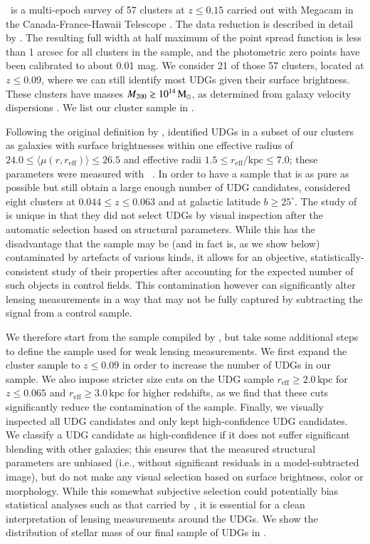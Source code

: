 \documentclass[usenatbib,fleqn]{mnras}
\def\reff{r_\mathrm{eff}}
\begin{document}
\meneacs\ is a multi-epoch survey of 57 clusters at $z\leq0.15$ carried out with Megacam in the Canada-France-Hawaii Telescope \citep{sand12}. The data reduction is described in detail by \cite{vdburg13,vdburg16}. The resulting full width at half maximum of the point spread function is less than 1 arcsec for all clusters in the sample, and the photometric zero points have been calibrated to about 0.01 mag.
%
We consider 21 of those 57 clusters, located at $z\leq0.09$, where we can still identify most UDGs given their surface brightness. These clusters have masses $M_{200}\gtrsim10^{14}\,\mathrm{M}_\odot$, as determined from galaxy velocity dispersions \citep{sifon15_cccp}. We list our cluster sample in .

Following the original definition by \cite{vandokkum15_coma}, \cite{vdburg16} identified UDGs in a subset of our clusters as galaxies with surface brightnesses within one effective radius of $24.0\leq \langle\mu(r,\reff)\rangle\leq26.5$ and effective radii $1.5\leq\reff/\mathrm{kpc}\leq7.0$; these parameters were measured with \galfit\ \citep{peng02,peng10}. In order to have a sample that is as pure as possible but still obtain a large enough number of UDG candidates, \cite{vdburg16} considered eight clusters at $0.044\leq z \leq0.063$ and at galactic latitude $b\geq25^\circ$. The study of \cite{vdburg16} is unique in that they did not select UDGs by visual inspection after the automatic selection based on structural parameters. While this has the disadvantage that the sample may be (and in fact is, as we show below) contaminated by artefacts of various kinds, it allows for an objective, statistically-consistent study of their properties after accounting for the expected number of such objects in control fields. This contamination however can significantly alter lensing measurements in a way that may not be fully captured by subtracting the signal from a control sample.

We therefore start from the sample compiled by \cite{vdburg16}, but take some additional steps to define the sample used for weak lensing measurements. We first expand the cluster sample to $z\leq0.09$ in order to increase the number of UDGs in our sample. We also impose stricter size cuts on the UDG sample $\reff\geq2.0\,\mathrm{kpc}$ for $z\leq0.065$ and $\reff\geq3.0\,\mathrm{kpc}$ for higher redshifts, as we find that these cuts significantly reduce the contamination of the sample. Finally, we visually inspected all UDG candidates and only kept high-confidence UDG candidates. We classify a UDG candidate as high-confidence if it does not suffer significant blending with other galaxies; this ensures that the measured structural parameters are unbiased (i.e., without significant residuals in a model-subtracted image), but do not make any visual selection based on surface brightness, color or morphology. While this somewhat subjective selection could potentially bias statistical analyses such as that carried by \cite{vdburg16}, it is essential for a clean interpretation of lensing measurements around the UDGs. We show the distribution of stellar mass of our final sample of UDGs in .
\end{document}
